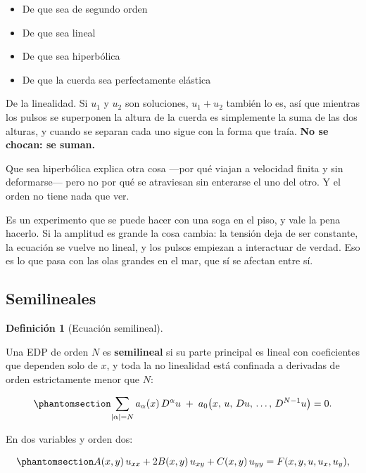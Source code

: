 \documentclass[
  spanish,
  a4paper,
]{scrbook}
\providecommand{\tightlist}{%
  \setlength{\itemsep}{0pt}\setlength{\parskip}{0pt}}
\theoremstyle{definition}
\newtheorem{definition}{Definición}[chapter]
\theoremstyle{plain}
\theoremstyle{definition}
\theoremstyle{plain}
\theoremstyle{definition}
\theoremstyle{remark}
\begin{document}
\begin{itemize}
\tightlist
\item
  {De que sea de segundo orden}
\item
  {De que sea lineal}
\item
  {De que sea hiperbólica}
\item
  {De que la cuerda sea perfectamente elástica}
\end{itemize}

De la linealidad. Si \(u_1\) y \(u_2\) son soluciones, \(u_1+u_2\)
también lo es, así que mientras los pulsos se superponen la altura de la
cuerda es simplemente la suma de las dos alturas, y cuando se separan
cada uno sigue con la forma que traía. \textbf{No se chocan: se suman.}

Que sea hiperbólica explica otra cosa ---por qué viajan a velocidad
finita y sin deformarse--- pero no por qué se atraviesan sin enterarse
el uno del otro. Y el orden no tiene nada que ver.

Es un experimento que se puede hacer con una soga en el piso, y vale la
pena hacerlo. Si la amplitud es grande la cosa cambia: la tensión deja
de ser constante, la ecuación se vuelve no lineal, y los pulsos empiezan
a interactuar de verdad. Eso es lo que pasa con las olas grandes en el
mar, que sí se afectan entre sí.

\subsection{Semilineales}\label{sec-semilineales}

\begin{definition}[Ecuación
semilineal]\protect\hypertarget{def-semilineal}{}\label{def-semilineal}

Una EDP de orden \(N\) es \textbf{semilineal} si su parte principal es
lineal con coeficientes que dependen solo de \(x\), y toda la no
linealidad está confinada a derivadas de orden estrictamente menor que
\(N\):

\begin{equation}\protect\phantomsection\label{eq-semilineal}{
\sum_{|\alpha| = N} a_\alpha(x)\, D^\alpha u \;+\; a_0\big(x,\,u,\,Du,\,\dots,\,D^{N-1}u\big) = 0 .
}\end{equation}

\end{definition}

En dos variables y orden dos:

\begin{equation}\protect\phantomsection\label{eq-semilineal-2var}{
A(x,y)\,u_{xx} + 2B(x,y)\,u_{xy} + C(x,y)\,u_{yy} = F(x,y,u,u_x,u_y),
}\end{equation}
\end{document}
